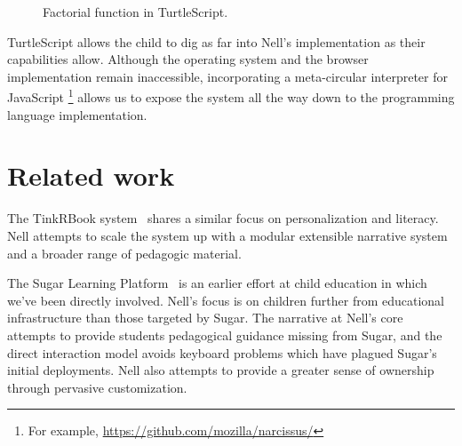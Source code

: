\documentclass[preprint]{sig-alternate}
\begin{document}
\begin{figure}
\centering
{}
\caption{Factorial function in TurtleScript.}\label{fig:turtlescript}
\end{figure}

TurtleScript allows the child to dig as far into Nell's implementation
as their capabilities allow.  Although the operating system and the
browser implementation remain inaccessible, incorporating a
meta-circular interpreter for JavaScript%
\footnote{For example, \url{https://github.com/mozilla/narcissus/}}
allows us to expose the system all the way down to the programming
language implementation.


\section{Related work}\label{sec:related}

The TinkRBook system~\cite{chang:tinkrbook} shares a similar focus on
personalization and literacy.  Nell attempts to scale the system up
with a modular extensible narrative system and a broader range
of pedagogic material.

The Sugar Learning Platform~\cite{sugar} is an earlier effort at
child education in which we've been directly involved.  Nell's focus is
on children further from educational infrastructure than those
targeted by Sugar.
The narrative at Nell's core attempts to provide students
pedagogical guidance missing from Sugar,
and the direct interaction model avoids keyboard
problems which have plagued Sugar's initial deployments.  Nell also
attempts to provide a greater sense of ownership through pervasive
customization.


\end{document}

